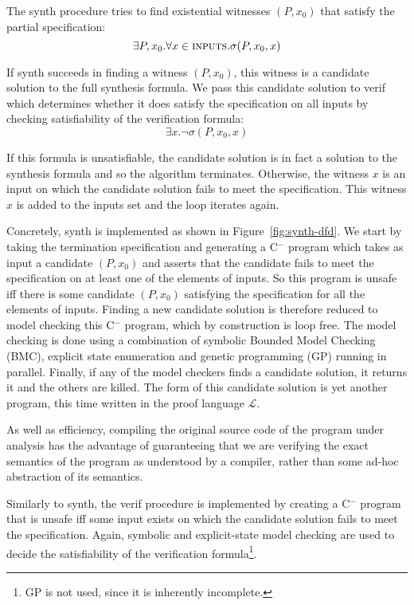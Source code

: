 \documentclass[preprint]{sigplanconf}
\theoremstyle{definition}
\newcommand{\newC}{C$^-$\xspace}
\begin{document}
The {\sc synth} procedure tries to find existential witnesses $(P, x_0)$
that satisfy the partial specification:
%
\[
 \exists P, x_0 . \forall x \in \text{\sc inputs} . \sigma(P, x_0, x)
\]

If {\sc synth} succeeds in finding a witness $(P, x_0)$, this witness is a
candidate solution to the full synthesis formula.  We pass this candidate
solution to {\sc verif} which determines whether it does satisfy
the specification on all inputs by checking satisfiability of the
verification formula:
%
\[
 \exists x . \lnot \sigma(P, x_0, x)
\]

If this formula is unsatisfiable, the candidate solution is in fact a
solution to the synthesis formula and so the algorithm terminates. 
Otherwise, the witness $x$ is an input on which the candidate solution fails
to meet the specification.  This witness $x$ is added to the {\sc inputs}
set and the loop iterates again.

Concretely, {\sc synth} is implemented as shown in
Figure~\ref{fig:synth-dfd}.  We start by taking the termination
specification and generating a \newC program which takes as input a candidate
$(P, x_0)$ and asserts that the candidate fails to meet the specification on
at least one of the elements of {\sc inputs}.  So this program is unsafe iff
there is some candidate $(P, x_0)$ satisfying the specification for all the
elements of {\sc inputs}.  Finding a new candidate solution is therefore
reduced to model checking this \newC program, which by construction is loop
free.  The model checking is done using a combination of symbolic Bounded Model
Checking (BMC), explicit state enumeration and genetic programming (GP) running in
parallel.
Finally, if any of the model checkers finds a candidate solution, it returns it
and the others are killed.  The form of
this candidate solution is yet another program, this time written in the
proof language $\mathcal{L}$.

As well as efficiency, compiling the original source code of the program
under analysis has the advantage of guaranteeing that we are verifying the
exact semantics of the program as understood by a compiler, rather than some
ad-hoc abstraction of its semantics.

Similarly to {\sc synth}, the {\sc verif} procedure is implemented by
creating a \newC program that is unsafe iff some input exists on which the
candidate solution fails to meet the specification.  Again, symbolic and
explicit-state model checking are used to decide the satisfiability of the
verification formula\footnote{GP is not used, since it is inherently incomplete.}.
\end{document}

